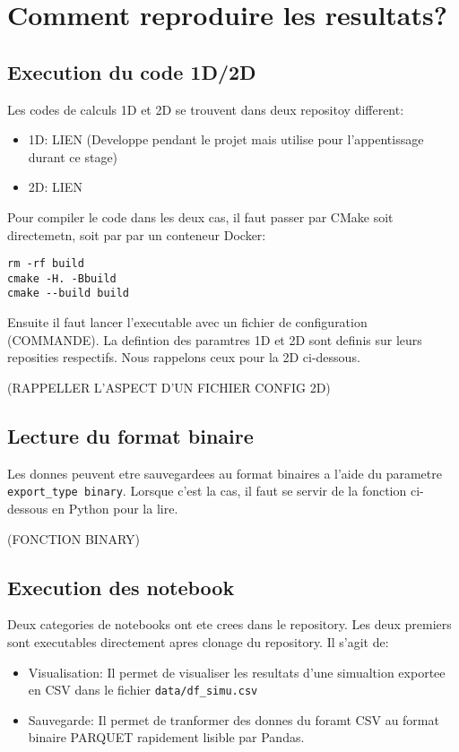 

\chapter{Comment reproduire les resultats?} %

\label{AppendixA} %

\section{Execution du code 1D/2D}

Les codes de calculs 1D et 2D se trouvent dans deux repositoy different:
\begin{itemize}
 \item 1D: LIEN (Developpe pendant le projet mais utilise pour l'appentissage durant ce stage)
 \item 2D: LIEN
\end{itemize}


Pour compiler le code dans les deux cas, il faut passer par CMake soit directemetn, soit par par un conteneur Docker:
\begin{verbatim}
rm -rf build
cmake -H. -Bbuild
cmake --build build
\end{verbatim}

Ensuite il faut lancer l'executable avec un fichier de configuration (COMMANDE). La defintion des paramtres 1D et 2D sont definis sur leurs reposities respectifs. Nous rappelons ceux pour la 2D ci-dessous.

(RAPPELLER L'ASPECT D'UN FICHIER CONFIG 2D)

\section{Lecture du format binaire}
Les donnes peuvent etre sauvegardees au format binaires a l'aide du parametre \verb|export_type binary|. Lorsque c'est la cas, il faut se servir de la fonction ci-dessous en Python pour la lire.

(FONCTION BINARY)

\section{Execution des notebook}
Deux categories de notebooks ont ete crees dans le repository. Les deux premiers sont executables directement apres clonage du repository. Il s'agit de:
\begin{itemize}
 \item Visualisation: Il permet de visualiser les resultats d'une simualtion exportee en CSV dans le fichier \verb|data/df_simu.csv|
 \item Sauvegarde: Il permet de tranformer des donnes du foramt CSV au format binaire PARQUET rapidement lisible par Pandas.
\end{itemize}

